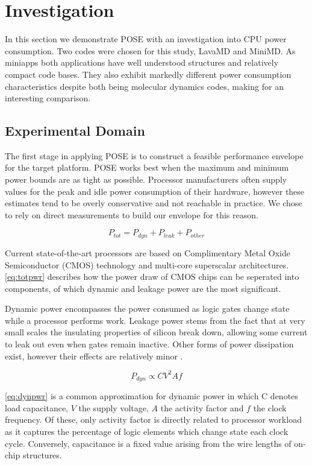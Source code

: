 \section{Investigation}
\label{sec:investigation}
In this section we demonstrate POSE with an investigation into CPU power consumption.
Two codes were chosen for this study, LavaMD and MiniMD.
As miniapps both applications have well understood structures and relatively compact code bases.
They also exhibit markedly different power consumption characteristics despite both being molecular dynamics codes, making for an interesting comparison.

\subsection{Experimental Domain}
The first stage in applying POSE is to construct a feasible performance envelope for the target platform.
POSE works best when the maximum and minimum power bounds are as tight as possible.
Processor manufacturers often supply values for the peak and idle power consumption of their hardware, however these estimates tend to be overly conservative and not reachable in practice.
We chose to rely on direct measurements to build our envelope for this reason.

\begin{equation}
\label{eq:totpwr}
P_{tot} = P_{dyn} + P_{leak} + P_{other}
\end{equation}

Current state-of-the-art processors are based on Complimentary Metal Oxide Semiconductor (CMOS) technology and multi-core superscalar architectures.
\autoref{eq:totpwr} describes how the power draw of CMOS chips can be seperated into components, of which dynamic and leakage power are the most significant.

Dynamic power encompasses the power consumed as logic gates change state while a processor performs work. 
Leakage power stems from the fact that at very small scales the insulating properties of silicon break down, allowing some current to leak out even when gates remain inactive.
Other forms of power dissipation exist, however their effects are relatively minor \cite{kaxiras:2008aa}.

\begin{equation} 
\label{eq:dynpwr}
P_{dyn} \propto CV^{2}Af
\end{equation}

\autoref{eq:dynpwr} is a common approximation for dynamic power in which C denotes load capacitance, $V$ the supply voltage, $A$ the activity factor and $f$ the clock frequency.
Of these, only activity factor is directly related to processor workload as it captures the percentage of logic elements which change state each clock cycle.
Conversely, capacitance is a fixed value arising from the wire lengths of on-chip structures.

